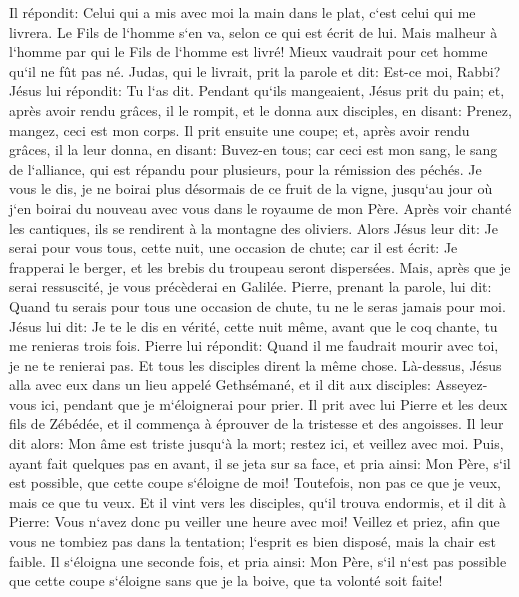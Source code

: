 \verse Il répondit: Celui qui a mis avec moi la main dans le plat, c`est celui qui me livrera. 
\verse Le Fils de l`homme s`en va, selon ce qui est écrit de lui. Mais malheur à l`homme par qui le Fils de l`homme est livré! Mieux vaudrait pour cet homme qu`il ne fût pas né. 
\verse Judas, qui le livrait, prit la parole et dit: Est-ce moi, Rabbi? Jésus lui répondit: Tu l`as dit. 
\verse Pendant qu`ils mangeaient, Jésus prit du pain; et, après avoir rendu grâces, il le rompit, et le donna aux disciples, en disant: Prenez, mangez, ceci est mon corps. 
\verse Il prit ensuite une coupe; et, après avoir rendu grâces, il la leur donna, en disant: Buvez-en tous; 
\verse car ceci est mon sang, le sang de l`alliance, qui est répandu pour plusieurs, pour la rémission des péchés. 
\verse Je vous le dis, je ne boirai plus désormais de ce fruit de la vigne, jusqu`au jour où j`en boirai du nouveau avec vous dans le royaume de mon Père. 
\verse Après voir chanté les cantiques, ils se rendirent à la montagne des oliviers. 
\verse Alors Jésus leur dit: Je serai pour vous tous, cette nuit, une occasion de chute; car il est écrit: Je frapperai le berger, et les brebis du troupeau seront dispersées. 
\verse Mais, après que je serai ressuscité, je vous précèderai en Galilée. 
\verse Pierre, prenant la parole, lui dit: Quand tu serais pour tous une occasion de chute, tu ne le seras jamais pour moi. 
\verse Jésus lui dit: Je te le dis en vérité, cette nuit même, avant que le coq chante, tu me renieras trois fois. 
\verse Pierre lui répondit: Quand il me faudrait mourir avec toi, je ne te renierai pas. Et tous les disciples dirent la même chose. 
\verse Là-dessus, Jésus alla avec eux dans un lieu appelé Gethsémané, et il dit aux disciples: Asseyez-vous ici, pendant que je m`éloignerai pour prier. 
\verse Il prit avec lui Pierre et les deux fils de Zébédée, et il commença à éprouver de la tristesse et des angoisses. 
\verse Il leur dit alors: Mon âme est triste jusqu`à la mort; restez ici, et veillez avec moi. 
\verse Puis, ayant fait quelques pas en avant, il se jeta sur sa face, et pria ainsi: Mon Père, s`il est possible, que cette coupe s`éloigne de moi! Toutefois, non pas ce que je veux, mais ce que tu veux. 
\verse Et il vint vers les disciples, qu`il trouva endormis, et il dit à Pierre: Vous n`avez donc pu veiller une heure avec moi! 
\verse Veillez et priez, afin que vous ne tombiez pas dans la tentation; l`esprit es bien disposé, mais la chair est faible. 
\verse Il s`éloigna une seconde fois, et pria ainsi: Mon Père, s`il n`est pas possible que cette coupe s`éloigne sans que je la boive, que ta volonté soit faite! 
